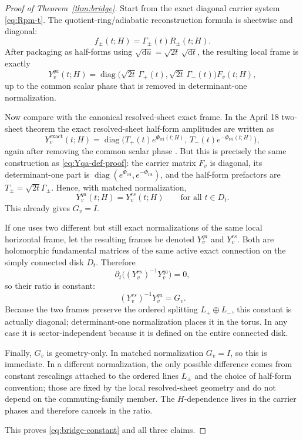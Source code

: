 \documentclass[11pt]{article}
\numberwithin{equation}{section}
\theoremstyle{definition}
\newcommand{\dd}{\mathrm d}
\newcommand{\diag}{\operatorname{diag}}
\begin{document}
\begin{proof}[Proof of Theorem~\ref{thm:bridge}]
Start from the exact diagonal carrier system \eqref{eq:Rpm-t}. The quotient-ring/adiabatic reconstruction formula is sheetwise and diagonal:
\begin{equation}
\label{eq:fi-Gamma-Ri}
 f_\pm(t;H)=\Gamma_\pm(t)R_\pm(t;H).
\end{equation}
After packaging as half-forms using $\sqrt{\dd u}=\sqrt{2t}\,\sqrt{\dd t}$, the resulting local frame is exactly
\begin{equation}
\label{eq:Yqa-def-proof}
Y_v^{qa}(t;H)=\diag\bigl(\sqrt{2t}\,\Gamma_+(t),\sqrt{2t}\,\Gamma_-(t)\bigr)F_v(t;H),
\end{equation}
up to the common scalar phase that is removed in determinant-one normalization.

Now compare with the canonical resolved-sheet exact frame. In the April 18 two-sheet theorem the exact resolved-sheet half-form amplitudes are written as
\begin{equation}
\label{eq:canonical-exact-basis}
Y_v^{\mathrm{exact}}(t;H)=\diag\bigl(T_+(t)e^{\Phi_{\mathrm{rel}}(t;H)},\,T_-(t)e^{-\Phi_{\mathrm{rel}}(t;H)}\bigr),
\end{equation}
again after removing the common scalar phase \cite{MainApril18,SuppApril18}. But this is precisely the same construction as \eqref{eq:Yqa-def-proof}: the carrier matrix $F_v$ is diagonal, its determinant-one part is $\diag(e^{\Phi_{\mathrm{rel}}},e^{-\Phi_{\mathrm{rel}}})$, and the half-form prefactors are $T_\pm=\sqrt{2t}\Gamma_\pm$. Hence, with matched normalization,
\begin{equation}
\label{eq:matched-identity}
Y_v^{qa}(t;H)=Y_v^{rs}(t;H)
\qquad\text{for all } t\in D_t.
\end{equation}
This already gives $G_v=I$.

If one uses two different but still exact normalizations of the same local horizontal frame, let the resulting frames be denoted $Y_v^{qa}$ and $Y_v^{rs}$. Both are holomorphic fundamental matrices of the same active exact connection on the simply connected disk $D_t$. Therefore
\begin{equation}
\label{eq:ratio-derivative}
\partial_t\bigl((Y_v^{rs})^{-1}Y_v^{qa}\bigr)=0,
\end{equation}
so their ratio is constant:
\[
(Y_v^{rs})^{-1}Y_v^{qa}=G_v.
\]
Because the two frames preserve the ordered splitting $L_+\oplus L_-$, this constant is actually diagonal; determinant-one normalization places it in the torus. In any case it is sector-independent because it is defined on the entire connected disk.

Finally, $G_v$ is geometry-only. In matched normalization $G_v=I$, so this is immediate. In a different normalization, the only possible difference comes from constant rescalings attached to the ordered lines $L_\pm$ and the choice of half-form convention; those are fixed by the local resolved-sheet geometry and do not depend on the commuting-family member. The $H$-dependence lives in the carrier phases and therefore cancels in the ratio.

This proves \eqref{eq:bridge-constant} and all three claims.
\end{proof}
\end{document}
